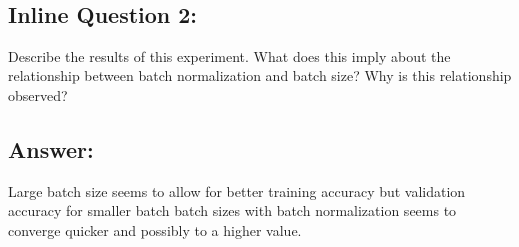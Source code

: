 \documentclass[11pt]{article}
\begin{document}
    \begin{center}
    \end{center}
    { \hspace*{\fill} \\}
    
    \hypertarget{inline-question-2}{%
\subsection{Inline Question 2:}\label{inline-question-2}}

Describe the results of this experiment. What does this imply about the
relationship between batch normalization and batch size? Why is this
relationship observed?

\hypertarget{answer}{%
\subsection{Answer:}\label{answer}}

Large batch size seems to allow for better training accuracy but
validation accuracy for smaller batch batch sizes with batch
normalization seems to converge quicker and possibly to a higher value.


    
    
    
    
\end{document}

